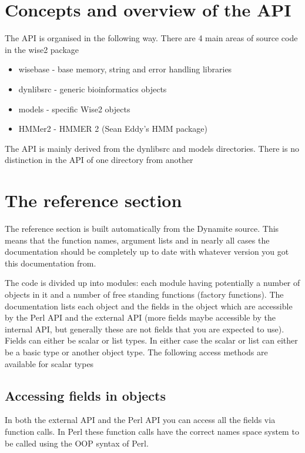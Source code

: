 \section{Concepts and overview of the API}

The API is organised in the following way. There are 4 main areas of source
code in the wise2 package
\begin{itemize}
\item wisebase - base memory, string and error handling libraries
\item dynlibsrc - generic bioinformatics objects
\item models - specific Wise2 objects
\item HMMer2 - HMMER 2 (Sean Eddy's HMM package)
\end{itemize}

The API is mainly derived from the dynlibsrc and models directories. There
is no distinction in the API of one directory from another 

\section{The reference section}

The reference section is built automatically from the 
Dynamite source. This means that the function names,
argument lists and in nearly all cases the documentation
should be completely up to date with whatever version
you got this documentation from.

The code is divided up into modules: each module having
potentially a number of objects in it and a number of
free standing functions (factory functions). The documentation
lists each object and the fields in the object which are
accessible by the Perl API and the external API (more fields
maybe accessible by the internal API, but generally these are
not fields that you are expected to use). Fields can either
be scalar or list types. In either case the scalar or list 
can either be a basic type or another object type. The following
access methods are available for scalar types

\subsection{Accessing fields in objects}
\label{accessing_fields}

In both the external API and the Perl API you can access all the
fields via function calls. In Perl these function calls have the
correct names space system to be called using the OOP syntax
of Perl.

